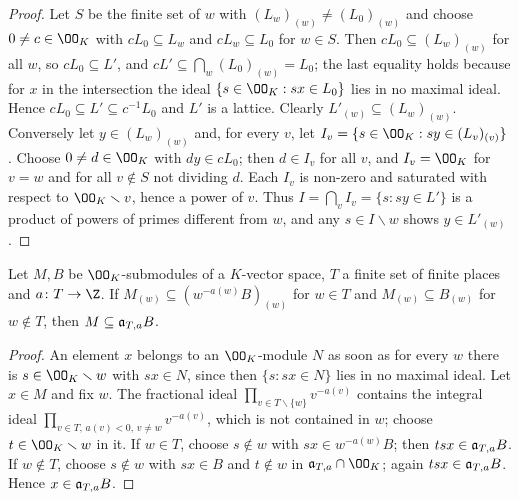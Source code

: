 \begin{proof}
Let $S$ be the finite set of $w$ with $(L_w)_{(w)}\ne(L_0)_{(w)}$ and choose $0\ne c\in\OO_K$ with $cL_0\subseteq L_w$
and $cL_w\subseteq L_0$ for $w\in S$. Then $cL_0\subseteq(L_w)_{(w)}$ for all $w$, so $cL_0\subseteq L'$, and
$cL'\subseteq\bigcap_w(L_0)_{(w)}=L_0$; the last equality holds because for $x$ in the intersection the ideal
$\{s\in\OO_K:sx\in L_0\}$ lies in no maximal ideal. Hence $cL_0\subseteq L'\subseteq c^{-1}L_0$ and $L'$ is a lattice.
Clearly $L'_{(w)}\subseteq(L_w)_{(w)}$. Conversely let $y\in(L_w)_{(w)}$ and, for every $v$, let
$I_v=\{s\in\OO_K:sy\in(L_v)_{(v)}\}$. Choose $0\ne d\in\OO_K$ with $dy\in cL_0$; then $d\in I_v$ for all $v$, and
$I_v=\OO_K$ for $v=w$ and for all $v\notin S$ not dividing $d$. Each $I_v$ is non-zero and saturated with respect to
$\OO_K\smallsetminus v$, hence a power of $v$. Thus $I=\bigcap_vI_v=\{s:sy\in L'\}$ is a product of powers of primes
different from $w$, and any $s\in I\smallsetminus w$ shows $y\in L'_{(w)}$.
\end{proof}

\begin{lemma}\label{pf:fit:locglob}
Let $M,B$ be $\OO_K$-submodules of a $K$-vector space, $T$ a finite set of finite places and $a\colon T\to\Z$. If
$M_{(w)}\subseteq(w^{-a(w)}B)_{(w)}$ for $w\in T$ and $M_{(w)}\subseteq B_{(w)}$ for $w\notin T$, then
$M\subseteq\mathfrak{a}_{T,a}B$.
\end{lemma}

\begin{proof}
An element $x$ belongs to an $\OO_K$-module $N$ as soon as for every $w$ there is $s\in\OO_K\smallsetminus w$ with
$sx\in N$, since then $\{s:sx\in N\}$ lies in no maximal ideal. Let $x\in M$ and fix $w$. The fractional ideal
$\prod_{v\in T\smallsetminus\{w\}}v^{-a(v)}$ contains the integral ideal $\prod_{v\in T,\,a(v)<0,\,v\ne w}v^{-a(v)}$, which
is not contained in $w$; choose $t\in\OO_K\smallsetminus w$ in it. If $w\in T$, choose $s\notin w$ with
$sx\in w^{-a(w)}B$; then $tsx\in\mathfrak{a}_{T,a}B$. If $w\notin T$, choose $s\notin w$ with $sx\in B$ and $t\notin w$ in
$\fitden_{T,a}\cap\OO_K$; again $tsx\in\mathfrak{a}_{T,a}B$. Hence $x\in\mathfrak{a}_{T,a}B$.
\end{proof}

